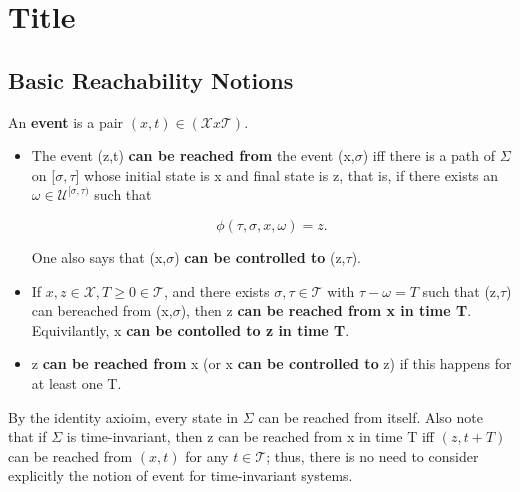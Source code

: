 \chapter{Title}
%
%
%
%


\section{Basic Reachability Notions}

\begin{leftbar}
\begin{define}
    An \textbf{event} is a pair $(x,t)\in (\mathcal{X} x \mathcal{T})$.

    \begin{itemize}
        \item The event (z,t) \textbf{can be reached from} the event (x,$\sigma$) iff there is a path of $\Sigma$  on [$\sigma,\tau$] whose initial state is x and final state is z, that is, if there exists an $\omega \in \mathcal{U}^{[\sigma,\tau)}$ such that
        
        $$
        \phi(\tau,\sigma,x,\omega)=z.
        $$
        
        One also says that (x,$\sigma$) \textbf{can be controlled to} (z,$\tau$).
        
        \item If $x,z \in \mathcal{X}, T\geq 0 \in \mathcal{T}$, and there exists $\sigma,\tau \in \mathcal{T}$ with $\tau-\omega =T$ such that (z,$\tau$) can bereached from (x,$\sigma$), then z \textbf{can be reached from x in time T}. Equivilantly, x \textbf{can be contolled to z in time T}.
        
        \item z \textbf{can be reached from} x (or x \textbf{can be controlled to} z) if this happens for at least one T.
    \end{itemize}
\end{define}
\end{leftbar}



By the identity axioim, every state in $\Sigma$ can be reached from itself. Also note that if $\Sigma$ is time-invariant, then z can be reached from x in time T iff $(z,t+T)$ can be reached from $(x,t)$ for any $t\in \mathcal{T}$; thus, there is no need to consider explicitly the notion of event for time-invariant systems. 

